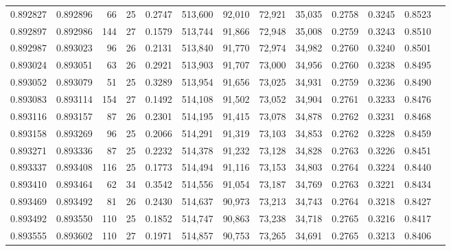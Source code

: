 \begin{tabular}{rrrrrrrrrrrrr}
0.892827 & 0.892896 &    66 &  25 &                                     0.2747 & 513,600 &  92,010 &  72,921 &  35,035 & 0.2758 & 0.3245 & 0.8523 \\
0.892897 & 0.892986 &   144 &  27 &                                     0.1579 & 513,744 &  91,866 &  72,948 &  35,008 & 0.2759 & 0.3243 & 0.8510 \\
0.892987 & 0.893023 &    96 &  26 &                                     0.2131 & 513,840 &  91,770 &  72,974 &  34,982 & 0.2760 & 0.3240 & 0.8501 \\
0.893024 & 0.893051 &    63 &  26 &                                     0.2921 & 513,903 &  91,707 &  73,000 &  34,956 & 0.2760 & 0.3238 & 0.8495 \\
0.893052 & 0.893079 &    51 &  25 &                                     0.3289 & 513,954 &  91,656 &  73,025 &  34,931 & 0.2759 & 0.3236 & 0.8490 \\
0.893083 & 0.893114 &   154 &  27 &                                     0.1492 & 514,108 &  91,502 &  73,052 &  34,904 & 0.2761 & 0.3233 & 0.8476 \\
0.893116 & 0.893157 &    87 &  26 &                                     0.2301 & 514,195 &  91,415 &  73,078 &  34,878 & 0.2762 & 0.3231 & 0.8468 \\
0.893158 & 0.893269 &    96 &  25 &                                     0.2066 & 514,291 &  91,319 &  73,103 &  34,853 & 0.2762 & 0.3228 & 0.8459 \\
0.893271 & 0.893336 &    87 &  25 &                                     0.2232 & 514,378 &  91,232 &  73,128 &  34,828 & 0.2763 & 0.3226 & 0.8451 \\
0.893337 & 0.893408 &   116 &  25 &                                     0.1773 & 514,494 &  91,116 &  73,153 &  34,803 & 0.2764 & 0.3224 & 0.8440 \\
0.893410 & 0.893464 &    62 &  34 &                                     0.3542 & 514,556 &  91,054 &  73,187 &  34,769 & 0.2763 & 0.3221 & 0.8434 \\
0.893469 & 0.893492 &    81 &  26 &                                     0.2430 & 514,637 &  90,973 &  73,213 &  34,743 & 0.2764 & 0.3218 & 0.8427 \\
0.893492 & 0.893550 &   110 &  25 &                                     0.1852 & 514,747 &  90,863 &  73,238 &  34,718 & 0.2765 & 0.3216 & 0.8417 \\
0.893555 & 0.893602 &   110 &  27 &                                     0.1971 & 514,857 &  90,753 &  73,265 &  34,691 & 0.2765 & 0.3213 & 0.8406 \\

\end{tabular}
